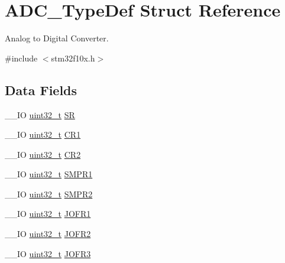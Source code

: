 \hypertarget{struct_a_d_c___type_def}{\section{A\-D\-C\-\_\-\-Type\-Def Struct Reference}
\label{struct_a_d_c___type_def}
}


Analog to Digital Converter.  




{\ttfamily \#include $<$stm32f10x.\-h$>$}

\subsection*{Data Fields}
\begin{DoxyCompactItemize}
\item 
\-\_\-\-\_\-\-I\-O \hyperlink{stdint_8h_a435d1572bf3f880d55459d9805097f62}{uint32\-\_\-t} \hyperlink{struct_a_d_c___type_def_a9745df96e98f3cdc2d05ccefce681f64}{S\-R}
\item 
\-\_\-\-\_\-\-I\-O \hyperlink{stdint_8h_a435d1572bf3f880d55459d9805097f62}{uint32\-\_\-t} \hyperlink{struct_a_d_c___type_def_a89b1ff4376683dd2896ea8b32ded05b2}{C\-R1}
\item 
\-\_\-\-\_\-\-I\-O \hyperlink{stdint_8h_a435d1572bf3f880d55459d9805097f62}{uint32\-\_\-t} \hyperlink{struct_a_d_c___type_def_a1053a65a21af0d27afe1bf9cf7b7aca7}{C\-R2}
\item 
\-\_\-\-\_\-\-I\-O \hyperlink{stdint_8h_a435d1572bf3f880d55459d9805097f62}{uint32\-\_\-t} \hyperlink{struct_a_d_c___type_def_a73009a8122fcc628f467a4e997109347}{S\-M\-P\-R1}
\item 
\-\_\-\-\_\-\-I\-O \hyperlink{stdint_8h_a435d1572bf3f880d55459d9805097f62}{uint32\-\_\-t} \hyperlink{struct_a_d_c___type_def_a9e68fe36c4c8fbbac294b5496ccf7130}{S\-M\-P\-R2}
\item 
\-\_\-\-\_\-\-I\-O \hyperlink{stdint_8h_a435d1572bf3f880d55459d9805097f62}{uint32\-\_\-t} \hyperlink{struct_a_d_c___type_def_aa005e656f528aaad28d70d61c9db9b81}{J\-O\-F\-R1}
\item 
\-\_\-\-\_\-\-I\-O \hyperlink{stdint_8h_a435d1572bf3f880d55459d9805097f62}{uint32\-\_\-t} \hyperlink{struct_a_d_c___type_def_aa20f76044c11042dde41c1060853fb82}{J\-O\-F\-R2}
\item 
\-\_\-\-\_\-\-I\-O \hyperlink{stdint_8h_a435d1572bf3f880d55459d9805097f62}{uint32\-\_\-t} \hyperlink{struct_a_d_c___type_def_ae9c78142f6edf8122384263878d09015}{J\-O\-F\-R3}
\item 

\end{DoxyCompactItemize}
